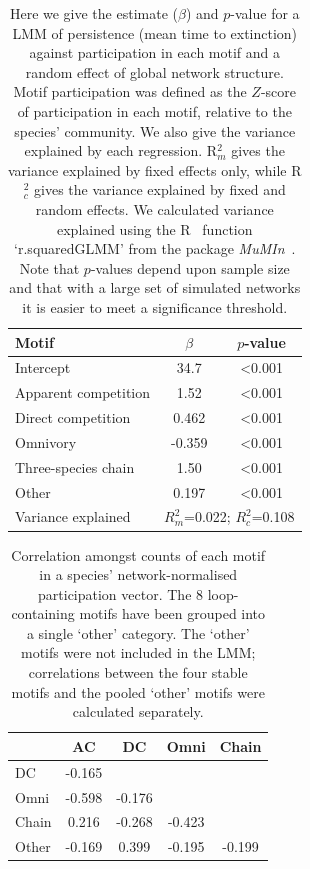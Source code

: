 \documentclass[12pt]{article}
\begin{document}
		\begin{table}[hb!]
		\caption{Here we give the estimate ($\beta$) and $p$-value for a LMM of persistence (mean time to extinction) against participation in each motif and a random effect of global network structure.  Motif participation was defined as the $Z$-score of participation in each motif, relative to the species' community. We also give the variance explained by each regression. R$^{2}_{m}$ gives the variance explained by fixed effects only, while R$^{2}_{c}$ gives the variance explained by fixed and random effects. We calculated variance explained using the R~\citep{R} function `r.squaredGLMM' from the package \emph{MuMIn}~\citep{MuMIn}. Note that $p$-values depend upon sample size and that with a large set of simulated networks it is easier to meet a significance threshold.}
		\label{tab:persistence_Z}
		\begin{tabular}{l | c c}
		 Motif & $\beta$ & $p$-value \\  
		 \hline
		 Intercept & 34.7 & \textless0.001 \\
		 \hline
		 Apparent competition & 1.52 & \textless0.001 \\
		 Direct competition &  0.462  & \textless0.001 \\
		 Omnivory & -0.359  & \textless0.001 \\
		 Three-species chain & 1.50 & \textless0.001 \\
		 Other &  0.197  & \textless0.001 \\
		 \hline
		 Variance explained & \multicolumn{2}{c}{$R^{2}_m$=0.022; $R^{2}_c$=0.108} \\
		 \hline
		 \end{tabular}
		 \end{table}


		\begin{table}[hb!]
		\caption{Correlation amongst counts of each motif in a species' network-normalised participation vector. The 8 loop-containing motifs have been grouped into a single `other' category. The `other' motifs were not included in the LMM; correlations between the four stable motifs and the pooled `other' motifs were calculated separately.}
		\label{tab:Z_correlations}
		\begin{tabular}{l | c c c c}
			& AC & DC & Omni & Chain \\
		\hline
		DC     & -0.165 &        &        &    \\
		Omni   & -0.598 & -0.176 &        &     \\
		Chain  &  0.216 & -0.268 & -0.423 &      \\
		Other  & -0.169 &  0.399 & -0.195 & -0.199 \\
		\hline
		\end{tabular}
		\end{table}
\end{document}
